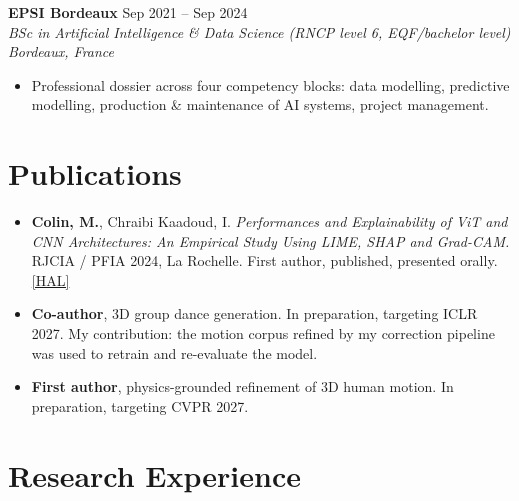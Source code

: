 \documentclass[10pt, letterpaper]{article}
\newcommand{\entry}[4]{%
  \noindent \textbf{#1} \hfill #2 \\
  \textit{#3} \hfill \textit{#4} \par
}
\begin{document}
\vspace{4pt}

\entry{EPSI Bordeaux}{Sep 2021 -- Sep 2024}%
{BSc in Artificial Intelligence \& Data Science (RNCP level 6, EQF/bachelor level)}{Bordeaux, France}
\begin{itemize}
    \item Professional dossier across four competency blocks: data modelling, predictive modelling, production \& maintenance of AI systems, project management.
\end{itemize}

\section{Publications}

\begin{itemize}
    \item \textbf{Colin, M.}, Chraibi Kaadoud, I. \textit{Performances and Explainability of ViT and CNN Architectures: An Empirical Study Using LIME, SHAP and Grad-CAM.} RJCIA / PFIA 2024, La Rochelle. First author, published, presented orally.
    \hfill \href{https://hal.science/hal-04641791}{[HAL]}
    \item \textbf{Co-author}, 3D group dance generation. In preparation, targeting ICLR 2027. My contribution: the motion corpus refined by my correction pipeline was used to retrain and re-evaluate the model.
    \item \textbf{First author}, physics-grounded refinement of 3D human motion. In preparation, targeting CVPR 2027.
\end{itemize}

\section{Research Experience}
\end{document}
